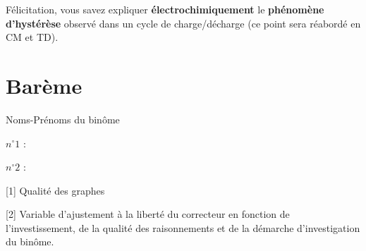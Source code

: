 \documentclass[twoside,a4paper,11pt,addpoints]{exam}%
\newcounter{foo} %
\begin{document}
Félicitation, vous savez expliquer \textbf{électrochimiquement} le \textbf{phénomène d'hystérèse} observé dans un cycle de charge/décharge (ce point sera réabordé en CM et TD).




\newpage

\section*{Barème}

\begin{minipage}{0.33\textwidth}
Noms-Prénoms du binôme
\end{minipage}\begin{minipage}{0.33\textwidth}
$n^\circ 1$ :
\end{minipage}\begin{minipage}{0.33\textwidth}
$n^\circ 2$ :
\end{minipage}

\begin{questions}
\setcounter{question}{\thefoo}

[1] Qualité des graphes

[2] Variable d'ajustement à la liberté du correcteur en fonction de l'investissement, de la qualité des raisonnements et de la démarche d'investigation du binôme.

\end{questions}

\begin{center}
\gradetable
\bonusgradetable
\end{center}
\end{document}
